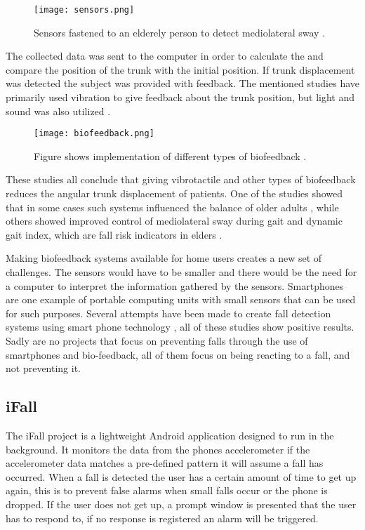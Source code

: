 \begin{figure}[h!]
  \centering
    \texttt{[image: sensors.png]}
    \caption{\footnotesize Sensors fastened to an elderely person to detect mediolateral sway \cite{vibrotactileTiltFeedback}.}
\end{figure}

The collected data was sent to the computer in order to calculate the and compare the position of the trunk with the initial position. If trunk displacement was detected the subject was provided with feedback. The mentioned studies have primarily used vibration to give feedback about the trunk position, but light and sound was also utilized \cite{multiModualBiofeedback}.

\begin{figure}[h!]
  \centering
    \texttt{[image: biofeedback.png]}
    \caption{\footnotesize Figure shows implementation of different types of biofeedback \cite{multiModualBiofeedback}.}
\end{figure}

These studies all conclude that giving vibrotactile and other types of biofeedback reduces the angular trunk displacement of patients. One of the studies showed that in some cases such systems influenced the balance of older adults \cite{multiModualBiofeedback}, while others showed improved control of mediolateral sway during gait and dynamic gait index, which are fall risk indicators in elders \cite{vibrotactileTiltFeedback}.

Making biofeedback systems available for home users creates a new set of challenges. The sensors would have to be smaller and there would be the need for a computer to interpret the information gathered by the sensors. Smartphones are one example of portable computing units with small sensors that can be used for such purposes. Several attempts have been made to create fall detection systems using smart phone technology \cite{iFall, semiSupervisedFallDetection, mobilePhoneBasedFallDetection, detectionOfFalls}, all of these studies show positive results. Sadly are no projects that focus on preventing falls through the use of smartphones and bio-feedback, all of them focus on being reacting to a fall, and not preventing it.

\subsection{iFall}
The iFall \cite{iFall} project is a lightweight Android application designed to run in the background. It monitors the data from the phones accelerometer if the accelerometer data matches a pre-defined pattern it will assume a fall has occurred. When a fall is detected the user has a certain amount of time to get up again, this is to prevent false alarms when small falls occur or the phone is dropped. If the user does not get up, a prompt window is presented that the user has to respond to, if no response is registered an alarm will be triggered. 

